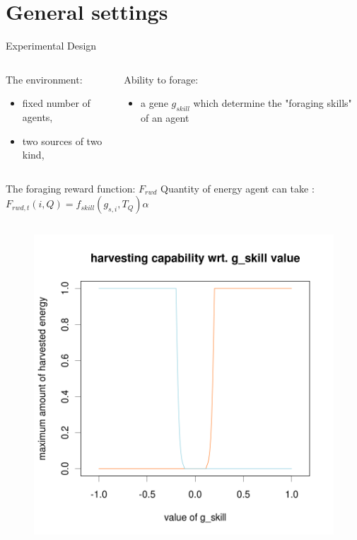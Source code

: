\documentclass[8pt, handout=show,notes=show]{beamer}
\begin{document}




\section{General settings}

\begin{frame}{Experimental Design}
	\begin{columns}[t]
			\begin{block}{The environment:}
				\begin{itemize}
					\item fixed number of agents,
					\item two sources of two kind,
				\end{itemize}
			\end{block}
			\begin{block}{Ability to forage:}
				\begin{itemize}
					\item a gene $g_{skill}$ which determine the "foraging skills" of an agent
				\end{itemize}
			\end{block}
	\end{columns}
	\begin{columns}
		\begin{block}{The foraging reward function: $F_{rwd}$}
			Quantity of energy agent can take :
			$F_{rwd,t}(i,Q) = f_{skill}\left(g_{s,i},T_Q\right)\alpha$%
		\end{block}
	\end{columns}
	\begin{figure}
		\includegraphics[width=.45\textwidth]{../images/sparsityEffect/f_skill}
	\end{figure}
\end{frame}
 
\end{document}
